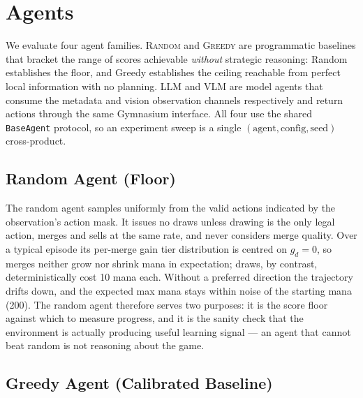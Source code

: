 \documentclass[11pt]{article}
\begin{document}
\section{Agents}
\label{sec:agents}

We evaluate four agent families. \textsc{Random} and \textsc{Greedy} are
programmatic baselines that bracket the range of scores achievable
\emph{without} strategic reasoning: Random establishes the floor, and
Greedy establishes the ceiling reachable from perfect local information
with no planning. \textsc{LLM} and \textsc{VLM} are model agents that
consume the metadata and vision observation channels respectively and
return actions through the same Gymnasium interface. All four use the
shared \texttt{BaseAgent} protocol, so an experiment sweep is a single
$(\text{agent}, \text{config}, \text{seed})$ cross-product.

\subsection{Random Agent (Floor)}
\label{sec:random-agent}

The random agent samples uniformly from the valid actions indicated by the
observation's action mask. It issues no draws unless drawing is the only
legal action, merges and sells at the same rate, and never considers
merge quality. Over a typical episode its per-merge gain tier distribution
is centred on $g_d = 0$, so merges neither grow nor shrink mana in
expectation; draws, by contrast, deterministically cost 10 mana each.
Without a preferred direction the trajectory drifts down, and the expected
max mana stays within noise of the starting mana (200). The random agent
therefore serves two purposes: it is the score floor against which to
measure progress, and it is the sanity check that the environment is
actually producing useful learning signal --- an agent that cannot beat
random is not reasoning about the game.

\subsection{Greedy Agent (Calibrated Baseline)}
\label{sec:greedy-agent}
\end{document}
